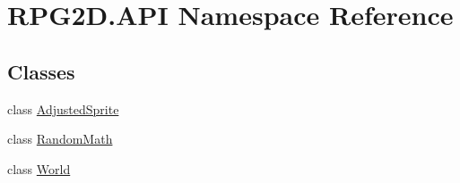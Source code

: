 \hypertarget{namespace_r_p_g2_d_1_1_a_p_i}{}\section{R\+P\+G2\+D.\+A\+PI Namespace Reference}
\label{namespace_r_p_g2_d_1_1_a_p_i}
\subsection*{Classes}
\begin{DoxyCompactItemize}
\item 
class \mbox{\hyperlink{class_r_p_g2_d_1_1_a_p_i_1_1_adjusted_sprite}{Adjusted\+Sprite}}
\item 
class \mbox{\hyperlink{class_r_p_g2_d_1_1_a_p_i_1_1_random_math}{Random\+Math}}
\item 
class \mbox{\hyperlink{class_r_p_g2_d_1_1_a_p_i_1_1_world}{World}}
\end{DoxyCompactItemize}
